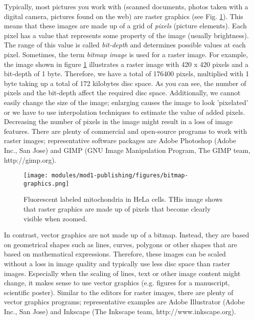 Typically, most pictures you work with (scanned documents, photos taken with a digital camera, pictures found on the web) are raster graphics (see Fig. \ref{fig:bitmap-graphics}). This means that these images are made up of a grid of \emph{pixels} (picture elements). Each pixel has a value that represents some property of the image (usually brightness). The range of this value is called \emph{bit-depth} and determines possible values at each pixel. Sometimes, the term \emph{bitmap image} is used for a raster image. For example, the image shown in figure \ref{fig:bitmap-graphics} illustrates a raster image with 420 x 420 pixels and a bit-depth of 1 byte. Therefore, we have a total of 176400 pixels, multiplied with 1 byte taking up a total of 172 kilobytes disc space. As you can see, the number of pixels and the bit-depth affect the required disc space. Additionally, we cannot easily change the size of the image; enlarging causes the image to look 'pixelated' or we have to use interpolation techniques to estimate the value of added pixels. Decreasing the number of pixels in the image might result in a loss of image features. There are plenty of commercial and open-source programs to work with raster images; representative software packages are Adobe Photoshop (Adobe Inc., San Jose) and GIMP (GNU Image Manipulation Program, The GIMP team, http://gimp.org).

\begin{figure}[!ht]
	\centering
		\texttt{[image: modules/mod1-publishing/figures/bitmap-graphics.png]}
	\caption{Fluorescent labeled mitochondria in HeLa cells. THis image shows that raster graphics are made up of pixels that become clearly visible when zoomed.}
	\label{fig:bitmap-graphics}
\end{figure}


In contrast, vector graphics are not made up of a bitmap. Instead, they are based on geometrical shapes such as lines, curves, polygons or other shapes that are based on mathematical expressions. Therefore, these images can be scaled without a loss in image quality and typically use less disc space than raster images. Especially when the scaling of lines, text or other image content might change, it makes sense to use vector graphics (e.g. figures for a manuscript, scientific poster). Similar to the editors for raster images, there are plenty of vector graphics programs; representative examples are Adobe Illustrator (Adobe Inc., San Jose) and Inkscape (The Inkscape team, http://www.inkscape.org).

